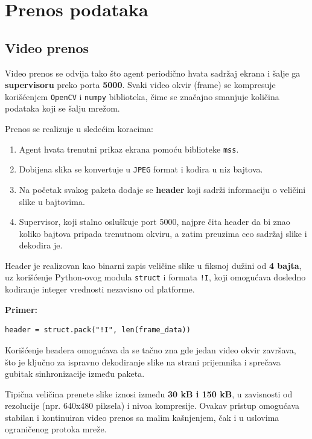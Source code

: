 \documentclass[a4paper,12pt]{article}
\begin{document}
\section{Prenos podataka}

\subsection{Video prenos}

Video prenos se odvija tako što agent periodično hvata sadržaj ekrana i šalje ga \textbf{supervisoru} preko porta \textbf{5000}. Svaki video okvir (frame) se kompresuje korišćenjem \texttt{OpenCV} i \texttt{numpy} biblioteka, čime se značajno smanjuje količina podataka koji se šalju mrežom.  

Prenos se realizuje u sledećim koracima:
\begin{enumerate}
    \item Agent hvata trenutni prikaz ekrana pomoću biblioteke \texttt{mss}.
    \item Dobijena slika se konvertuje u \texttt{JPEG} format i kodira u niz bajtova.
    \item Na početak svakog paketa dodaje se \textbf{header} koji sadrži informaciju o veličini slike u bajtovima.
    \item Supervisor, koji stalno osluškuje port 5000, najpre čita header da bi znao koliko bajtova pripada trenutnom okviru, a zatim preuzima ceo sadržaj slike i dekodira je.
\end{enumerate}

Header je realizovan kao binarni zapis veličine slike u fiksnoj dužini od \textbf{4 bajta}, uz korišćenje Python-ovog modula \texttt{struct} i formata \texttt{!I}, koji omogućava dosledno kodiranje integer vrednosti nezavisno od platforme.  

\textbf{Primer:}
\begin{verbatim}
header = struct.pack("!I", len(frame_data))
\end{verbatim}

Korišćenje headera omogućava da se tačno zna gde jedan video okvir završava, što je ključno za ispravno dekodiranje slike na strani prijemnika i sprečava gubitak sinhronizacije između paketa.  

Tipična veličina prenete slike iznosi između \textbf{30 kB i 150 kB}, u zavisnosti od rezolucije (npr. 640x480 piksela) i nivoa kompresije. Ovakav pristup omogućava stabilan i kontinuiran video prenos sa malim kašnjenjem, čak i u uslovima ograničenog protoka mreže.
\end{document}
